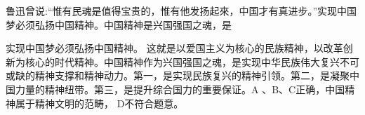 \question 鲁迅曾说:``惟有民魂是值得宝贵的，惟有他发扬起來，中国才有真进步。''实现中国梦必须弘扬中国精神。中国精神是兴国强国之魂，是
\par{}
\begin{solution}实现中国梦必须弘扬中国精神。
这就是以爱国主义为核心的民族精神，以改革创新为核心的时代精神。中国精神作为兴国强国之魂，是实现中华民族伟大复兴不可或缺的精神支撑和精神动力。第一，是实现民族复兴的精神引领。第二，是凝聚中国力量的精神纽带。第三，是提升综合国力的重要保证。A
、B、C正确，中国精神属于精神文明的范畴， D不符合题意。
\end{solution}
